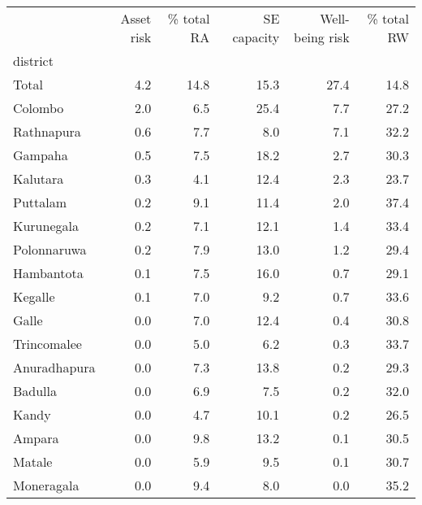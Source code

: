 \begin{tabular}{lrrrrr}
\toprule
{} &  Asset risk &  \% total RA &  SE capacity &  Well-being risk &  \% total RW \\
district     &             &             &              &                  &             \\
\midrule
Total        &         4.2 &        14.8 &         15.3 &             27.4 &        14.8 \\
Colombo      &         2.0 &         6.5 &         25.4 &              7.7 &        27.2 \\
Rathnapura   &         0.6 &         7.7 &          8.0 &              7.1 &        32.2 \\
Gampaha      &         0.5 &         7.5 &         18.2 &              2.7 &        30.3 \\
Kalutara     &         0.3 &         4.1 &         12.4 &              2.3 &        23.7 \\
Puttalam     &         0.2 &         9.1 &         11.4 &              2.0 &        37.4 \\
Kurunegala   &         0.2 &         7.1 &         12.1 &              1.4 &        33.4 \\
Polonnaruwa  &         0.2 &         7.9 &         13.0 &              1.2 &        29.4 \\
Hambantota   &         0.1 &         7.5 &         16.0 &              0.7 &        29.1 \\
Kegalle      &         0.1 &         7.0 &          9.2 &              0.7 &        33.6 \\
Galle        &         0.0 &         7.0 &         12.4 &              0.4 &        30.8 \\
Trincomalee  &         0.0 &         5.0 &          6.2 &              0.3 &        33.7 \\
Anuradhapura &         0.0 &         7.3 &         13.8 &              0.2 &        29.3 \\
Badulla      &         0.0 &         6.9 &          7.5 &              0.2 &        32.0 \\
Kandy        &         0.0 &         4.7 &         10.1 &              0.2 &        26.5 \\
Ampara       &         0.0 &         9.8 &         13.2 &              0.1 &        30.5 \\
Matale       &         0.0 &         5.9 &          9.5 &              0.1 &        30.7 \\
Moneragala   &         0.0 &         9.4 &          8.0 &              0.0 &        35.2 \\

\end{tabular}
